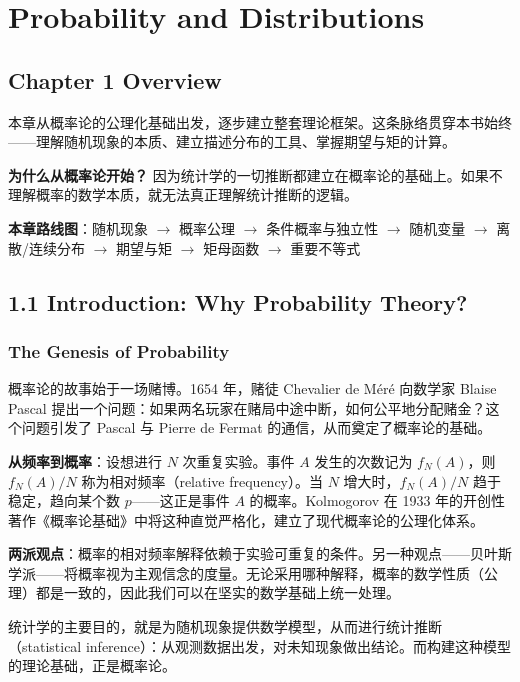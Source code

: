 \chapter{Probability and Distributions}\label{chap:probability-distribution}

\section*{Chapter 1 Overview}

本章从概率论的公理化基础出发，逐步建立整套理论框架。这条脉络贯穿本书始终——理解随机现象的本质、建立描述分布的工具、掌握期望与矩的计算。

\textbf{为什么从概率论开始？} 因为统计学的一切推断都建立在概率论的基础上。如果不理解概率的数学本质，就无法真正理解统计推断的逻辑。

\textbf{本章路线图}：随机现象 $\to$ 概率公理 $\to$ 条件概率与独立性 $\to$ 随机变量 $\to$ 离散/连续分布 $\to$ 期望与矩 $\to$ 矩母函数 $\to$ 重要不等式

\section{1.1 Introduction: Why Probability Theory?}\label{sec:1.1}

\subsection{The Genesis of Probability}

概率论的故事始于一场赌博。1654 年，赌徒 Chevalier de Méré 向数学家 Blaise Pascal 提出一个问题：如果两名玩家在赌局中途中断，如何公平地分配赌金？这个问题引发了 Pascal 与 Pierre de Fermat 的通信，从而奠定了概率论的基础。

\textbf{从频率到概率}：设想进行 $N$ 次重复实验。事件 $A$ 发生的次数记为 $f_N(A)$，则 $f_N(A)/N$ 称为相对频率（relative frequency）。当 $N$ 增大时，$f_N(A)/N$ 趋于稳定，趋向某个数 $p$——这正是事件 $A$ 的概率。Kolmogorov 在 1933 年的开创性著作《概率论基础》中将这种直觉严格化，建立了现代概率论的公理化体系。

\textbf{两派观点}：概率的相对频率解释依赖于实验可重复的条件。另一种观点——贝叶斯学派——将概率视为主观信念的度量。无论采用哪种解释，概率的数学性质（公理）都是一致的，因此我们可以在坚实的数学基础上统一处理。

统计学的主要目的，就是为随机现象提供数学模型，从而进行统计推断（statistical inference）：从观测数据出发，对未知现象做出结论。而构建这种模型的理论基础，正是概率论。


